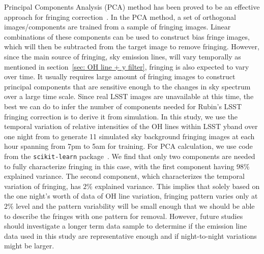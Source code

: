 \documentclass[twocolumn]{aastex63} %
\begin{document}
\begin{CJK*}{UTF8}{gbsn}
Principal Components Analysis (PCA) method has been proved to be an effective approach for fringing correction~\citep{Waters20,Medford21}. In the PCA method, a set of orthogonal images/components are trained from a sample of fringing images. Linear combinations of these components can be used to construct bias fringe images, which will then be subtracted from the target image to remove fringing. However, since the main source of fringing, sky emission lines, will vary temporally as mentioned in section~\ref{sec: OH line + y filter}, fringing is also expected to vary over time. It usually requires large amount of fringing images to construct principal components that are sensitive enough to the changes in sky spectrum over a large time scale. Since real LSST images are unavailable at this time, the best we can do to infer the number of components needed for Rubin's LSST fringing correction is to derive it from simulation. In this study, we use the temporal variation of relative intensities of the OH lines within LSST yband over one night from \citet{Noll15} to generate 11 simulated sky background fringing images at each hour spanning from 7pm to 5am for training. For PCA calculation, we use code from the \verb|scikit-learn| package~\citep{scikit-learn}. We find that only two components are needed to fully characterize fringing in this case, with the first component having $98\%$ explained variance. The second component, which characterizes the temporal variation of fringing, has $2\%$ explained variance. This implies that solely based on the one night's worth of data of OH line variation, fringing pattern varies only at $2\%$ level and the pattern variability will be small enough that we should be able to describe the fringes with one pattern for removal. However, future studies should investigate a longer term data sample to determine if the emission line data used in this study are representative enough and if night-to-night variations might be larger.



\end{CJK*}
\end{document}

